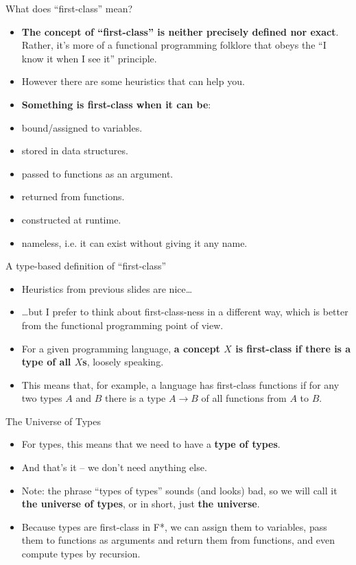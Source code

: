\documentclass{beamer}
\begin{document}
\begin{frame}{What does ``first-class'' mean?}
\begin{itemize}
	\item \textbf{The concept of ``first-class'' is neither precisely defined nor exact}. Rather, it's more of a functional programming folklore that obeys the ``I know it when I see it'' principle.
	\item However there are some heuristics that can help you.
	\item \textbf{Something is first-class when it can be}:
	\item bound/assigned to variables.
	\item stored in data structures.
	\item passed to functions as an argument.
	\item returned from functions.
	\item constructed at runtime.
	\item nameless, i.e. it can exist without giving it any name.
\end{itemize}
\end{frame}

\begin{frame}{A type-based definition of ``first-class''}
\begin{itemize}
	\item Heuristics from previous slides are nice\dots
	\item \dots but I prefer to think about first-class-ness in a different way, which is better from the functional programming point of view.
	\item For a given programming language, \textbf{a concept $X$ is first-class if there is a type of all $X$s}, loosely speaking.
	\item This means that, for example, a language has first-class functions if for any two types $A$ and $B$ there is a type $A \to B$ of all functions from $A$ to $B$.
\end{itemize}
\end{frame}

\begin{frame}{The Universe of Types}
\begin{itemize}
	\item For types, this means that we need to have a \textbf{type of types}.
	\item And that's it -- we don't need anything else.
	\item Note: the phrase ``types of types'' sounds (and looks) bad, so we will call it \textbf{the universe of types}, or in short, just \textbf{the universe}.
	\item Because types are first-class in F*, we can assign them to variables, pass them to functions as arguments and return them from functions, and even compute types by recursion.
\end{itemize}
\end{frame}
\end{document}
